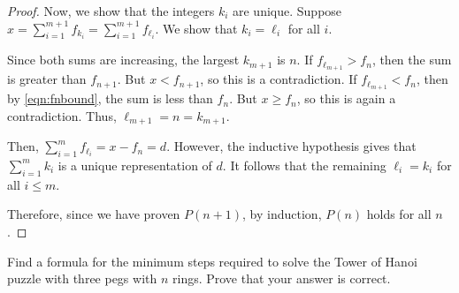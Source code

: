 \documentclass{agony}
\begin{document}
\begin{proof}
  Now, we show that the integers $k_i$ are unique.
  Suppose $x = \sum_{i=1}^{m+1} f_{k_i} = \sum_{i=1}^{m+1} f_{\ell_i}$.
  We show that $k_i = \ell_i$ for all $i$.

  Since both sums are increasing, the largest $k_{m+1}$ is $n$.
  If $f_{\ell_{m+1}} > f_n$, then the sum is greater than $f_{n+1}$.
  But $x < f_{n+1}$, so this is a contradiction.
  If $f_{\ell_{m+1}} < f_n$, then by \cref{eqn:fnbound}, the sum is less than $f_n$.
  But $x \geq f_n$, so this is again a contradiction.
  Thus, $\ell_{m+1} = n = k_{m+1}$.

  Then, $\sum_{i=1}^m f_{\ell_i} = x - f_n = d$.
  However, the inductive hypothesis gives that $\sum_{i=1}^m k_i$
  is a unique representation of $d$.
  It follows that the remaining $\ell_i = k_i$ for all $i \leq m$.

  Therefore, since we have proven $P(n+1)$, by induction, $P(n)$ holds for all $n$.
\end{proof}


\question Find a formula for the minimum steps required to solve the Tower of Hanoi puzzle with three pegs with $n$ rings.
Prove that your answer is correct.
\end{document}
